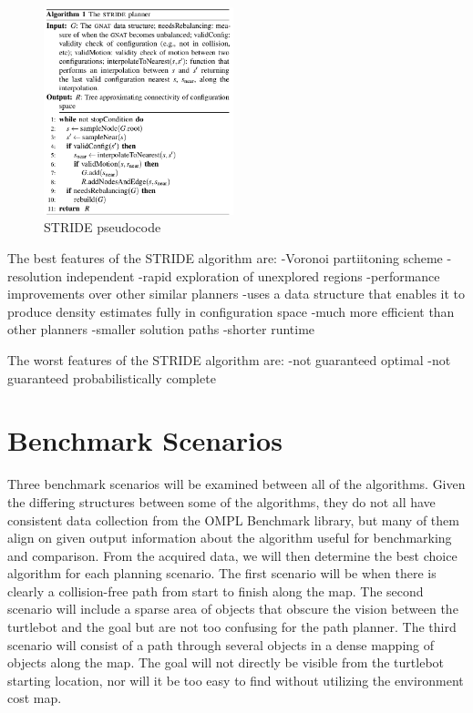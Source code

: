 \documentclass[conference]{IEEEtran} \usepackage[T1]{fontenc} \usepackage[backend=biber, style=ieee]{biblatex}
\begin{document}
\begin{figure}
\label{figure10} 
\centering 
\includegraphics[width=0.49\textwidth]{stride}
\caption{STRIDE pseudocode}
\end{figure}

The best features of the STRIDE algorithm are:
-Voronoi partiitoning scheme
-resolution independent
-rapid exploration of unexplored regions
-performance improvements over other similar planners
-uses a data structure that enables it to produce density estimates fully in configuration space
-much more efficient than other planners
-smaller solution paths
-shorter runtime

The worst features of the STRIDE algorithm are:
-not guaranteed optimal
-not guaranteed probabilistically complete

\section{Benchmark Scenarios} \label{Benchmark Scenarios}

Three benchmark scenarios will be examined between all of the algorithms. Given the differing structures between some of the algorithms, they do not all
have consistent data collection from the OMPL Benchmark library, but many of them align on given output information about the algorithm useful for benchmarking
and comparison. From the acquired data, we will then determine the best choice algorithm for each planning scenario. The first scenario will be when there is clearly a 
collision-free path from start to finish along the map. The second scenario will include a sparse area of objects that obscure the vision between the turtlebot and 
the goal but are not too confusing for the path planner. The third scenario will consist of a path through several objects in a dense mapping of objects along the map. 
The goal will not directly be visible from the turtlebot starting location, nor will it be too easy to find without utilizing the environment cost map.
\end{document}
